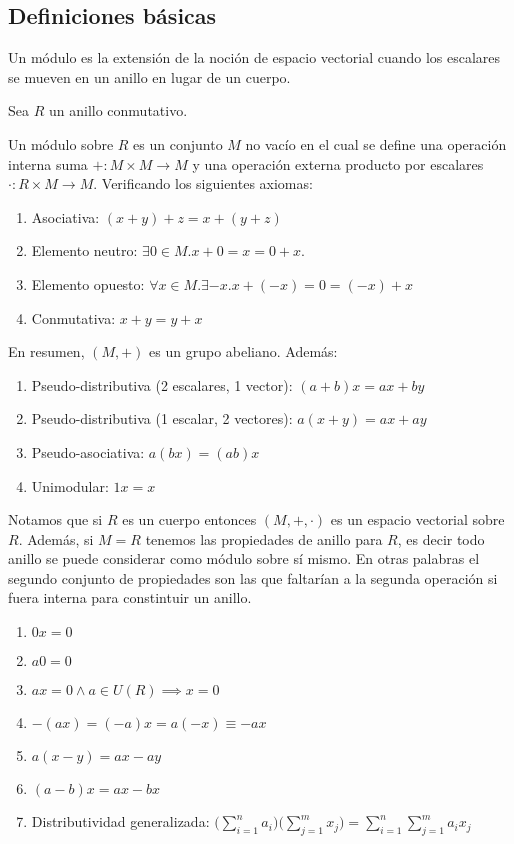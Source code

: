 \subsection{Definiciones básicas}

Un módulo es la extensión de la noción de espacio vectorial cuando los escalares se mueven en un anillo en lugar de un cuerpo. 

\begin{definition}[Módulo]
Sea $R$ un anillo conmutativo. 

Un módulo sobre $R$ es un conjunto $M$ no vacío en el cual se define una operación interna suma $+:M \times M \to M$ y una operación externa producto por escalares $\cdot:R \times M \to M$. Verificando los siguientes axiomas:

\begin{enumerate}
\item Asociativa: $(x+y)+z = x+(y+z)$
\item Elemento neutro: $\exists 0 \in M.x+0 = x = 0+x$.
\item Elemento opuesto: $\forall x \in M.\exists -x.x+(-x) = 0 = (-x)+x$
\item Conmutativa: $x+y = y+x$
\end{enumerate}

En resumen, $(M,+)$ es un grupo abeliano. Además:

\begin{enumerate}
\item Pseudo-distributiva (2 escalares, 1 vector): $(a+b)x = ax+by$
\item Pseudo-distributiva (1 escalar, 2 vectores): $a(x+y) = ax+ay$
\item Pseudo-asociativa: $a(bx) = (ab)x$
\item Unimodular: $1x = x$
\end{enumerate}
\end{definition}

Notamos que si $R$ es un cuerpo entonces $(M,+,\cdot)$ es un espacio vectorial sobre $R$. Además, si $M = R$ tenemos las propiedades de anillo para $R$, es decir todo anillo se puede considerar como módulo sobre sí mismo. En otras palabras el segundo conjunto de propiedades son las que faltarían a la segunda operación si fuera interna para constintuir un anillo. 

\begin{corollary}
\begin{enumerate}
\item $0x = 0$
\item $a0 = 0$
\item $ax = 0 \land a \in U(R) \implies x = 0$
\item $-(ax) = (-a)x = a(-x) \equiv -ax$
\item $a(x-y) = ax-ay$
\item $(a-b)x = ax - bx$
\item Distributividad generalizada: $\Big(\sum_{i = 1}^n a_i\Big)\Big(\sum_{j = 1}^m x_j\Big) = \sum_{i = 1}^n \sum_{j = 1}^m a_ix_j$
\end{enumerate}
\end{corollary}

